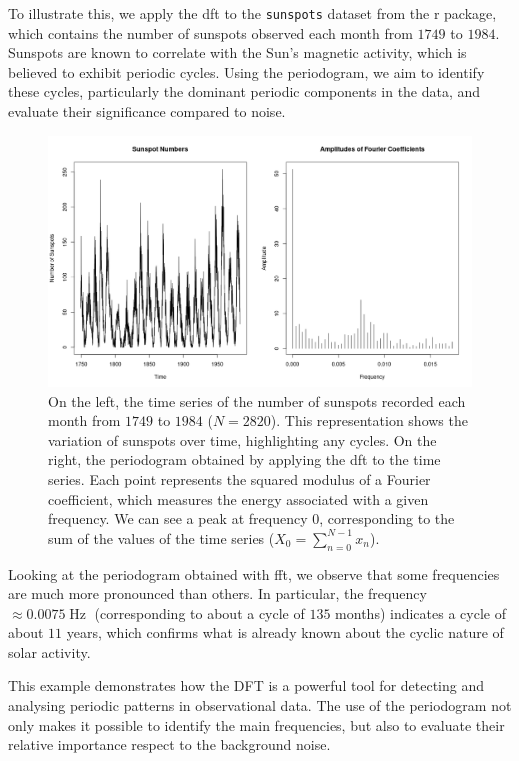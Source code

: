 \noindent To illustrate this, we apply the \gls{dft} to the \texttt{sunspots} dataset from the \gls{r} package, which contains the number of sunspots observed each month from $1749$ to $1984$. Sunspots are known to correlate with the Sun's magnetic activity, which is believed to exhibit periodic cycles. Using the periodogram, we aim to identify these cycles, particularly the dominant periodic components in the data, and evaluate their significance compared to noise.
\begin{figure}[ht]
	\centering
	\includegraphics[width=\textwidth]{Figures/sunspots.png}
	\caption[Periodogram of sunspots]{On the left, the time series of the number of sunspots recorded each month from $1749$ to $1984$ (\(N = 2820\)). This representation shows the variation of sunspots over time, highlighting any cycles. On the right, the periodogram obtained by applying the \gls{dft} to the time series. Each point represents the squared modulus of a Fourier coefficient, which measures the energy associated with a given frequency. We can see a peak at frequency $0$, corresponding to the sum of the values of the time series (\(X_0 = \sum_{n=0}^{N-1} x_n\)).}
\end{figure}

\noindent Looking at the periodogram obtained with \gls{fft}, we observe that some frequencies are much more pronounced than others. In particular, the frequency $\approx 0.0075\operatorname{\mathrm{Hz}}$ (corresponding to about a cycle of $135$ months) indicates a cycle of about $11$ years, which confirms what is already known about the cyclic nature of solar activity.

\noindent This example demonstrates how the DFT is a powerful tool for detecting and analysing periodic patterns in observational data. The use of the periodogram not only makes it possible to identify the main frequencies, but also to evaluate their relative importance respect to the background noise.
